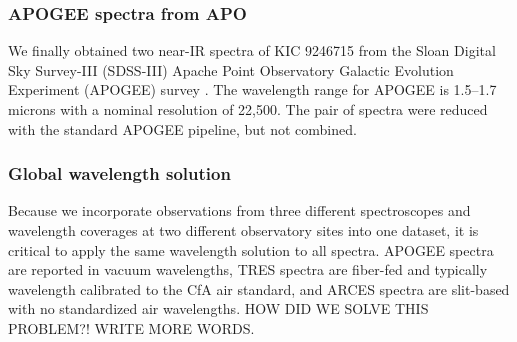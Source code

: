 \subsubsection{APOGEE spectra from APO}\label{apogee}
We finally obtained two near-IR spectra of KIC 9246715 from the Sloan Digital Sky Survey-III (SDSS-III) Apache Point Observatory Galactic Evolution Experiment (APOGEE) survey \citep{2015arXiv150100963A}. The wavelength range for APOGEE is 1.5--1.7 microns with a nominal resolution of 22,500. The pair of spectra were reduced with the standard APOGEE pipeline, but not combined.

\subsubsection{Global wavelength solution}\label{wavelength}
Because we incorporate observations from three different spectroscopes and wavelength coverages at two different observatory sites into one dataset, it is critical to apply the same wavelength solution to all spectra. APOGEE spectra are reported in vacuum wavelengths, TRES spectra are fiber-fed and typically wavelength calibrated to the CfA air standard, and ARCES spectra are slit-based with no standardized air wavelengths. HOW DID WE SOLVE THIS PROBLEM?! WRITE MORE WORDS.